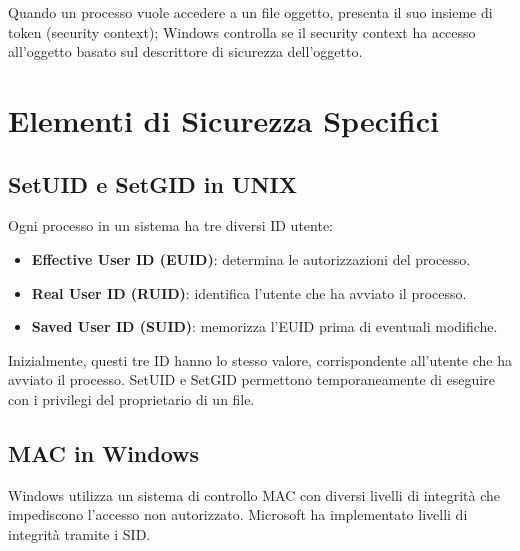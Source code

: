 Quando un processo vuole accedere a un file oggetto, presenta il suo insieme di token (security context);
Windows controlla se il security context ha accesso all'oggetto basato sul descrittore di sicurezza dell'oggetto.


\section{Elementi di Sicurezza Specifici}

\subsection{SetUID e SetGID in UNIX}
Ogni processo in un sistema ha tre diversi ID utente:
\begin{itemize}
    \item \textbf{Effective User ID (EUID)}: determina le autorizzazioni del processo.
    \item \textbf{Real User ID (RUID)}: identifica l'utente che ha avviato il processo.
    \item \textbf{Saved User ID (SUID)}: memorizza l'EUID prima di eventuali modifiche.
\end{itemize}

\noindent Inizialmente, questi tre ID hanno lo stesso valore, corrispondente all'utente che ha avviato il processo.
SetUID e SetGID permettono temporaneamente di eseguire con i privilegi del proprietario di un file.

\subsection{MAC in Windows}
Windows utilizza un sistema di controllo MAC con diversi livelli di integrità che impediscono l'accesso non autorizzato.
Microsoft ha implementato livelli di integrità tramite i SID.

